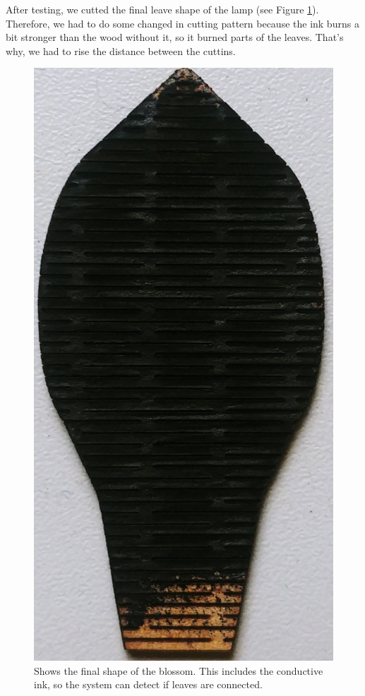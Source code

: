 \documentclass[00_doc.tex]{subfiles}
\begin{document}
    After testing, we cutted the final leave shape of the lamp (see Figure \ref{fig:finalLaserCut}). Therefore, we had to do some changed 
    in cutting pattern because the ink burns a bit stronger than the wood without it, so it burned 
    parts of the leaves. That's why, we had to rise the distance between the cuttins.   

    \begin{figure}[h!]
        \centering
        \includegraphics[scale=0.05]{images/process/07_LaserCut.jpg}
        \caption{Shows the final shape of the blossom. This includes the conductive ink, so the system can detect if leaves are connected.}
        \label{fig:finalLaserCut}
    \end{figure}
\end{document}
